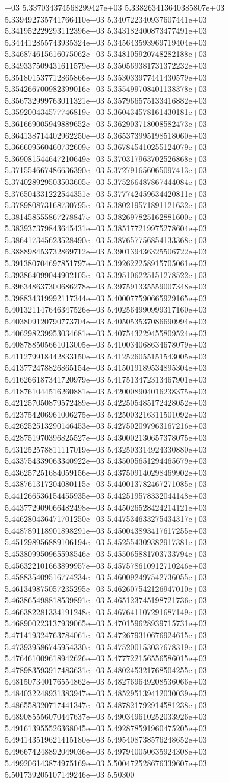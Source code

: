 +03	5.337034374568299427e+03	5.338263413640385807e+03	5.339492735741766410e+03	5.340722340937607441e+03	5.341952229293112396e+03	5.343182400873477491e+03	5.344412855743935324e+03	5.345643593969719404e+03	5.346874615616075062e+03	5.348105920748282188e+03	5.349337509431611579e+03	5.350569381731372232e+03	5.351801537712865866e+03	5.353033977441430579e+03	5.354266700982399016e+03	5.355499708401138378e+03	5.356732999763011321e+03	5.357966575133416882e+03	5.359200434577746819e+03	5.360434578161430181e+03	5.361669005949889652e+03	5.362903718008582473e+03	5.364138714402962250e+03	5.365373995198518060e+03	5.366609560460732609e+03	5.367845410255124079e+03	5.369081544647210649e+03	5.370317963702526868e+03	5.371554667486636390e+03	5.372791656065097413e+03	5.374028929503503605e+03	5.375266487867444084e+03	5.376504331222544351e+03	5.377742459634420811e+03	5.378980873168730795e+03	5.380219571891121632e+03	5.381458555867278847e+03	5.382697825162881600e+03	5.383937379843645431e+03	5.385177219975278604e+03	5.386417345623528490e+03	5.387657756854133368e+03	5.388898453732869712e+03	5.390139436325506722e+03	5.391380704697851797e+03	5.392622258915705061e+03	5.393864099044902105e+03	5.395106225151278522e+03	5.396348637300686278e+03	5.397591335559007348e+03	5.398834319992117344e+03	5.400077590665929165e+03	5.401321147646347526e+03	5.402564990999317160e+03	5.403809120790773704e+03	5.405053537086690994e+03	5.406298239953034681e+03	5.407543229455809524e+03	5.408788505661013005e+03	5.410034068634678079e+03	5.411279918442833150e+03	5.412526055151543005e+03	5.413772478826865154e+03	5.415019189534895304e+03	5.416266187341720979e+03	5.417513472313467901e+03	5.418761044516260881e+03	5.420008904016238375e+03	5.421257050879572489e+03	5.422505485172428052e+03	5.423754206961006275e+03	5.425003216311501092e+03	5.426252513290146453e+03	5.427502097963167216e+03	5.428751970396825527e+03	5.430002130657378075e+03	5.431252578811117019e+03	5.432503314924330880e+03	5.433754339063340922e+03	5.435005651294465679e+03	5.436257251684059156e+03	5.437509140298469902e+03	5.438761317204080115e+03	5.440013782467271085e+03	5.441266536154455935e+03	5.442519578332044148e+03	5.443772909066482498e+03	5.445026528424214121e+03	5.446280436471701250e+03	5.447534633275434317e+03	5.448789118901898291e+03	5.450043893417617255e+03	5.451298956889106194e+03	5.452554309382917381e+03	5.453809950965598546e+03	5.455065881703733794e+03	5.456322101663899957e+03	5.457578610912710246e+03	5.458835409516774234e+03	5.460092497542736055e+03	5.461349875057235295e+03	5.462607542126947010e+03	5.463865498818539891e+03	5.465123745198721736e+03	5.466382281334191248e+03	5.467641107291687149e+03	5.468900223137939065e+03	5.470159628939715731e+03	5.471419324763784061e+03	5.472679310676924615e+03	5.473939586745954330e+03	5.475200153037678319e+03	5.476461009618942626e+03	5.477722156556586015e+03	5.478983593917483631e+03	5.480245321768504255e+03	5.481507340176554862e+03	5.482769649208536066e+03	5.484032248931383947e+03	5.485295139412030039e+03	5.486558320717441347e+03	5.487821792914581238e+03	5.489085556070447637e+03	5.490349610252033926e+03	5.491613955526368045e+03	5.492878591960475205e+03	5.494143519621415180e+03	5.495408738576248652e+03	5.496674248892049036e+03	5.497940050635924308e+03	5.499206143874975169e+03	5.500472528676339607e+03	5.501739205107149246e+03	5.50300